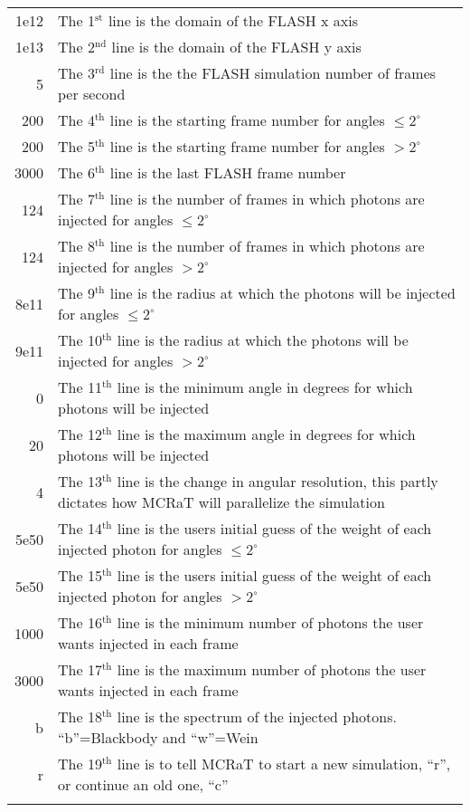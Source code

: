 \documentclass[12pt,a4paper]{article}
\begin{document}
\begin{tabularx}{\linewidth}{r X}
1e12 &   The 1$^\textrm{st}$ line is the domain of the FLASH x axis \\ 
1e13 &   The 2$^\textrm{nd}$ line is the domain of the FLASH y axis \\ 
5 &   The 3$^\textrm{rd}$ line is the the FLASH simulation number of frames per second  \\ 
200 &    The 4$^\textrm{th}$ line is the starting frame number for angles $\le 2^\circ$\\ 
200 &   The 5$^\textrm{th}$ line is the starting frame number for angles $> 2^\circ$ \\ 
3000 &   The 6$^\textrm{th}$ line is the last FLASH frame number \\ 
124 &    The 7$^\textrm{th}$ line is the number of frames in which photons are injected for angles $\le 2^\circ$\\ 
124 &   The 8$^\textrm{th}$ line is the number of frames in which photons are injected for angles $> 2^\circ$ \\ 
8e11 &    The 9$^\textrm{th}$ line is the radius at which the photons will be injected for angles $\le 2^\circ$\\ 
9e11 &   The 10$^\textrm{th}$ line is the radius at which the photons will be injected for angles $> 2^\circ$ \\ 
0 &   The 11$^\textrm{th}$ line is the minimum angle in degrees for which photons will be injected \\ 
20 &   The 12$^\textrm{th}$ line is the maximum angle in degrees for which photons will be injected \\ 
4 &   The 13$^\textrm{th}$ line is the change in angular resolution, this partly dictates how MCRaT will parallelize the simulation \\ 
5e50 &   The 14$^\textrm{th}$ line is the users initial guess of the weight of each injected photon for angles $\le 2^\circ$ \\ 
5e50 &    The 15$^\textrm{th}$ line is the users initial guess of the weight of each injected photon for angles $> 2^\circ$\\ 
1000 &   The 16$^\textrm{th}$ line is the minimum number of photons the user wants injected in each frame \\ 
3000 &    The 17$^\textrm{th}$ line is the maximum number of photons the user wants injected in each frame\\ 
b &   The 18$^\textrm{th}$ line is the spectrum of the injected photons. ``b''=Blackbody and ``w''=Wein \\ 
r &    The 19$^\textrm{th}$ line is to tell MCRaT to start a new simulation, ``r'', or continue an old one, ``c'' \\ \newline
\end{tabularx} 
\end{document}
